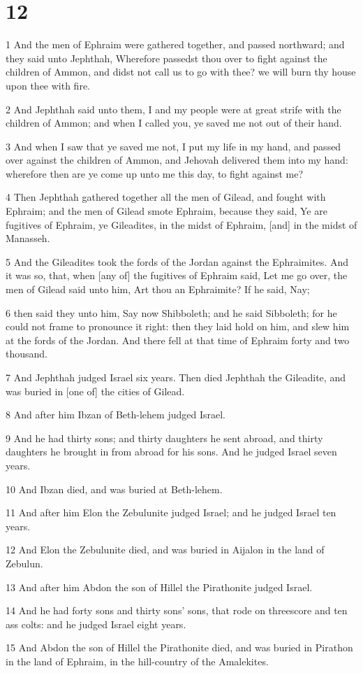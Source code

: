 \chapter{12}

\par 1 And the men of Ephraim were gathered together, and passed northward; and they said unto Jephthah, Wherefore passedst thou over to fight against the children of Ammon, and didst not call us to go with thee? we will burn thy house upon thee with fire.
\par 2 And Jephthah said unto them, I and my people were at great strife with the children of Ammon; and when I called you, ye saved me not out of their hand.
\par 3 And when I saw that ye saved me not, I put my life in my hand, and passed over against the children of Ammon, and Jehovah delivered them into my hand: wherefore then are ye come up unto me this day, to fight against me?
\par 4 Then Jephthah gathered together all the men of Gilead, and fought with Ephraim; and the men of Gilead smote Ephraim, because they said, Ye are fugitives of Ephraim, ye Gileadites, in the midst of Ephraim, [and] in the midst of Manasseh.
\par 5 And the Gileadites took the fords of the Jordan against the Ephraimites. And it was so, that, when [any of] the fugitives of Ephraim said, Let me go over, the men of Gilead said unto him, Art thou an Ephraimite? If he said, Nay;
\par 6 then said they unto him, Say now Shibboleth; and he said Sibboleth; for he could not frame to pronounce it right: then they laid hold on him, and slew him at the fords of the Jordan. And there fell at that time of Ephraim forty and two thousand.
\par 7 And Jephthah judged Israel six years. Then died Jephthah the Gileadite, and was buried in [one of] the cities of Gilead.
\par 8 And after him Ibzan of Beth-lehem judged Israel.
\par 9 And he had thirty sons; and thirty daughters he sent abroad, and thirty daughters he brought in from abroad for his sons. And he judged Israel seven years.
\par 10 And Ibzan died, and was buried at Beth-lehem.
\par 11 And after him Elon the Zebulunite judged Israel; and he judged Israel ten years.
\par 12 And Elon the Zebulunite died, and was buried in Aijalon in the land of Zebulun.
\par 13 And after him Abdon the son of Hillel the Pirathonite judged Israel.
\par 14 And he had forty sons and thirty sons' sons, that rode on threescore and ten ass colts: and he judged Israel eight years.
\par 15 And Abdon the son of Hillel the Pirathonite died, and was buried in Pirathon in the land of Ephraim, in the hill-country of the Amalekites.


